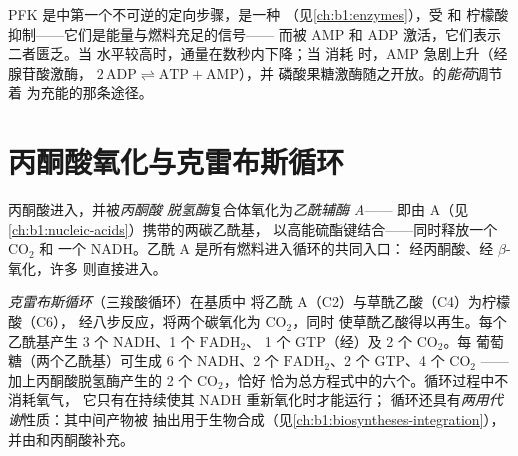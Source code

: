 \begin{proposition}[磷酸果糖激酶的调控]\label{prop:b1:respiration-fermentation:pfk}
PFK 是中第一个不可逆的定向步骤，是一种
（见\cref{ch:b1:enzymes}），受  和
柠檬酸抑制——它们是能量与燃料充足的信号——
而被 AMP 和 ADP 激活，它们表示二者匮乏。当
 水平较高时，通量在数秒内下降；当
消耗  时，AMP 急剧上升（经腺苷酸激酶，
$2\,\mathrm{ADP} \rightleftharpoons \mathrm{ATP} + \mathrm{AMP}$），并
磷酸果糖激酶随之开放。的\emph{能荷}调节着
为充能的那条途径。
\end{proposition}

\section{丙酮酸氧化与克雷布斯循环}

\begin{definition}[丙酮酸脱氢酶与乙酰辅酶 A]\label{def:b1:respiration-fermentation:pdh}
丙酮酸进入，并被\emph{丙酮酸
脱氢酶}复合体氧化为\emph{乙酰辅酶 A}——
即由 A（见\cref{ch:b1:nucleic-acids}）携带的两碳乙酰基，
以高能硫酯键结合——同时释放一个 $\mathrm{CO_2}$ 和
一个 NADH。乙酰 A 是所有燃料进入循环的共同入口：
经丙酮酸、经 $\beta$-氧化，许多
则直接进入。
\end{definition}

\begin{definition}[克雷布斯循环]\label{def:b1:respiration-fermentation:krebs}
\emph{克雷布斯循环}（三羧酸循环）在基质中
将乙酰 A（C2）与草酰乙酸（C4）为柠檬酸（C6），
经八步反应，将两个碳氧化为 $\mathrm{CO_2}$，同时
使草酰乙酸得以再生。每个乙酰基产生 3 个 NADH、1 个 $\mathrm{FADH_2}$、
1 个 GTP（经）及 2 个 $\mathrm{CO_2}$。每
葡萄糖（两个乙酰基）可生成 6 个 NADH、2 个 $\mathrm{FADH_2}$、2 个 GTP、4 个 $\mathrm{CO_2}$
——加上丙酮酸脱氢酶产生的 2 个 $\mathrm{CO_2}$，恰好
恰为总方程式中的六个。循环过程中不消耗氧气，
它只有在持续使其 NADH 重新氧化时才能运行；
循环还具有\emph{两用代谢}性质：其中间产物被
抽出用于生物合成（见\cref{ch:b1:biosyntheses-integration}），
并由和丙酮酸补充。
\end{definition}

